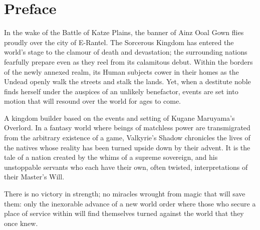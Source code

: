\chapter{Preface}

In the wake of the Battle of Katze Plains, the banner of Ainz Ooal Gown flies proudly over the city of E-Rantel. The Sorcerous Kingdom has entered the world’s stage to the clamour of death and devastation; the surrounding nations fearfully prepare even as they reel from its calamitous debut. Within the borders of the newly annexed realm, its Human subjects cower in their homes as the Undead openly walk the streets and stalk the lands. Yet, when a destitute noble finds herself under the auspices of an unlikely benefactor, events are set into motion that will resound over the world for ages to come.

A kingdom builder based on the events and setting of Kugane Maruyama’s Overlord. In a fantasy world where beings of matchless power are transmigrated from the arbitrary existence of a game, Valkyrie’s Shadow chronicles the lives of the natives whose reality has been turned upside down by their advent. It is the tale of a nation created by the whims of a supreme sovereign, and his unstoppable servants who each have their own, often twisted, interpretations of their Master’s Will. 



There is no victory in strength; no miracles wrought from magic that will save them: only the inexorable advance of a new world order where those who secure a place of service within will find themselves turned against the world that they once knew.

\cleardoublepage   %